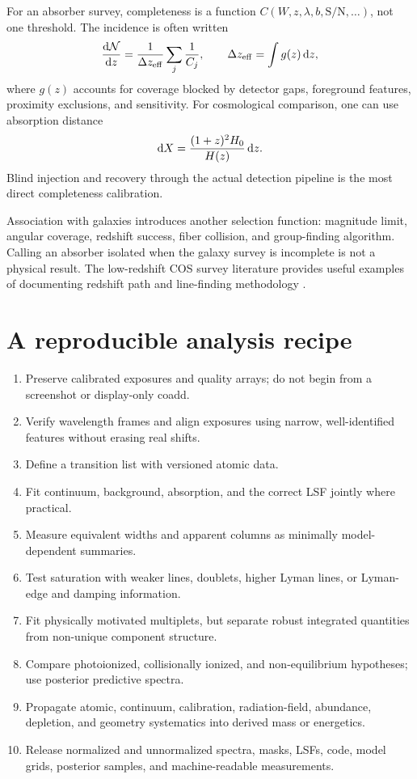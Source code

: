 For an absorber survey, completeness is a function
$C(W,z,\lambda,b,\mathrm{S/N},\ldots)$, not one threshold. The incidence is
often written
\begin{equation}
 \frac{{\rm d}{\cal N}}{{\rm d}z}
 =\frac{1}{\Delta z_{\rm eff}}
  \sum_j \frac{1}{C_j},
 \qquad
 \Delta z_{\rm eff}=\int g(z)\,{\rm d}z,
\end{equation}
where $g(z)$ accounts for coverage blocked by detector gaps, foreground
features, proximity exclusions, and sensitivity. For cosmological comparison,
one can use absorption distance
\begin{equation}
 {\rm d}X=\frac{(1+z)^2H_0}{H(z)}\,{\rm d}z.
\end{equation}
Blind injection and recovery through the actual detection pipeline is the
most direct completeness calibration.

Association with galaxies introduces another selection function: magnitude
limit, angular coverage, redshift success, fiber collision, and group-finding
algorithm. Calling an absorber isolated when the galaxy survey is incomplete
is not a physical result. The low-redshift COS survey literature provides
useful examples of documenting redshift path and line-finding methodology
\citep{Danforth2016}.

\section{A reproducible analysis recipe}

\begin{enumerate}
  \item Preserve calibrated exposures and quality arrays; do not begin from a
  screenshot or display-only coadd.
  \item Verify wavelength frames and align exposures using narrow,
  well-identified features without erasing real shifts.
  \item Define a transition list with versioned atomic data.
  \item Fit continuum, background, absorption, and the correct LSF jointly
  where practical.
  \item Measure equivalent widths and apparent columns as minimally
  model-dependent summaries.
  \item Test saturation with weaker lines, doublets, higher Lyman lines, or
  Lyman-edge and damping information.
  \item Fit physically motivated multiplets, but separate robust integrated
  quantities from non-unique component structure.
  \item Compare photoionized, collisionally ionized, and non-equilibrium
  hypotheses; use posterior predictive spectra.
  \item Propagate atomic, continuum, calibration, radiation-field, abundance,
  depletion, and geometry systematics into derived mass or energetics.
  \item Release normalized and unnormalized spectra, masks, LSFs, code, model
  grids, posterior samples, and machine-readable measurements.
\end{enumerate}

